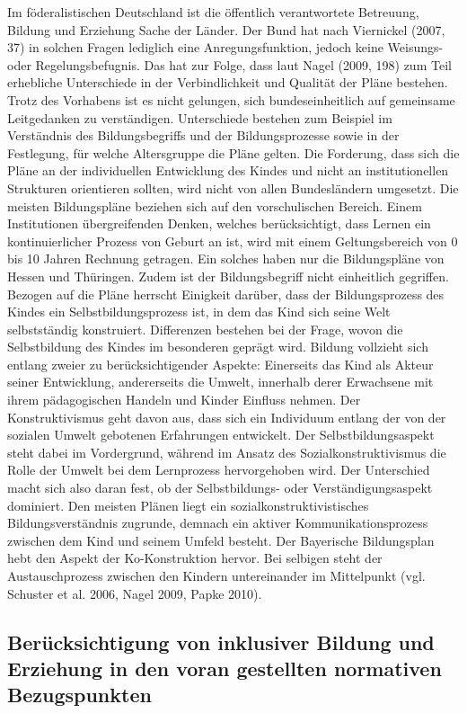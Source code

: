 Im föderalistischen Deutschland ist die öffentlich verantwortete Betreuung, Bildung und Erziehung Sache der Länder. Der Bund hat nach Viernickel (2007, 37) in solchen Fragen lediglich eine Anregungsfunktion, jedoch keine Weisungs- oder Regelungsbefugnis. Das hat zur Folge, dass laut Nagel (2009, 198) zum Teil erhebliche Unterschiede in der Verbindlichkeit und Qualität der Pläne bestehen. Trotz des Vorhabens ist es nicht gelungen, sich bundeseinheitlich auf gemeinsame Leitgedanken zu verständigen. Unterschiede bestehen zum Beispiel im Verständnis des Bildungsbegriffs und der Bildungsprozesse sowie in der Festlegung, für welche Altersgruppe die Pläne gelten. Die Forderung, dass sich die Pläne an der individuellen Entwicklung des Kindes und nicht an institutionellen Strukturen orientieren sollten, wird nicht von allen Bundesländern umgesetzt. Die meisten Bildungspläne beziehen sich auf den vorschulischen Bereich. Einem Institutionen übergreifenden Denken, welches berücksichtigt, dass Lernen ein kontinuierlicher Prozess von Geburt an ist, wird mit einem Geltungsbereich von 0 bis 10 Jahren Rechnung getragen. Ein solches haben nur die Bildungspläne von Hessen und Thüringen.  
Zudem ist der Bildungsbegriff nicht einheitlich gegriffen. Bezogen auf die Pläne herrscht Einigkeit darüber, dass der Bildungsprozess des Kindes ein Selbstbildungsprozess ist, in dem das Kind sich seine Welt selbstständig konstruiert. Differenzen bestehen bei der Frage, wovon die Selbstbildung des Kindes im besonderen geprägt wird. Bildung vollzieht sich entlang zweier zu berücksichtigender Aspekte: Einerseits das Kind als Akteur seiner Entwicklung, andererseits die Umwelt, innerhalb derer Erwachsene mit ihrem pädagogischen Handeln und Kinder Einfluss nehmen. Der Konstruktivismus geht davon aus, dass sich ein Individuum entlang der von der sozialen Umwelt gebotenen Erfahrungen entwickelt. Der Selbstbildungsaspekt steht dabei im Vordergrund, während im Ansatz des Sozialkonstruktivismus die Rolle der Umwelt bei dem Lernprozess hervorgehoben wird. Der Unterschied macht sich also daran fest, ob der Selbstbildungs- oder Verständigungsaspekt dominiert. Den meisten Plänen liegt ein sozialkonstruktivistisches Bildungsverständnis zugrunde, demnach ein aktiver Kommunikationsprozess zwischen dem Kind und seinem Umfeld besteht. Der Bayerische Bildungsplan hebt den Aspekt der Ko-Konstruktion hervor. Bei selbigen steht der Austauschprozess zwischen den Kindern untereinander im Mittelpunkt (vgl. Schuster et al. 2006, Nagel 2009, Papke 2010).

\subsection{Berücksichtigung von inklusiver Bildung und Erziehung in den voran gestellten normativen Bezugspunkten}\label{kap:beruecksichtigung}

